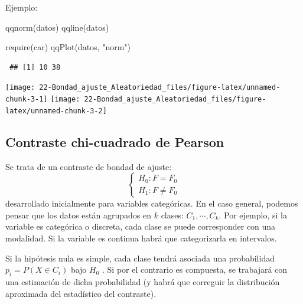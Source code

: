 \documentclass[
  10pt,
]{book}
\newenvironment{Shaded}{\begin{snugshade}}{\end{snugshade}}
\newcommand{\FunctionTok}[1]{\textcolor[rgb]{0.00,0.00,0.00}{#1}}
\newcommand{\NormalTok}[1]{#1}
\newcommand{\StringTok}[1]{\textcolor[rgb]{0.31,0.60,0.02}{#1}}
\theoremstyle{break}
\theoremstyle{nonumberplain}
\begin{document}
Ejemplo:

\begin{Shaded}
\begin{Highlighting}[]
\FunctionTok{qqnorm}\NormalTok{(datos)}
\FunctionTok{qqline}\NormalTok{(datos)}

\FunctionTok{require}\NormalTok{(car)}
\FunctionTok{qqPlot}\NormalTok{(datos, }\StringTok{"norm"}\NormalTok{)}
\end{Highlighting}
\end{Shaded}

\begin{verbatim}
 ## [1] 10 38
\end{verbatim}

\begin{center}\texttt{[image: 22-Bondad\_ajuste\_Aleatoriedad\_files/figure-latex/unnamed-chunk-3-1]} \texttt{[image: 22-Bondad\_ajuste\_Aleatoriedad\_files/figure-latex/unnamed-chunk-3-2]} \end{center}

\hypertarget{chi2test}{%
\subsection{Contraste chi-cuadrado de Pearson}\label{chi2test}}

Se trata de un contraste de bondad de ajuste:
\[\left \{
\begin{array}{l}
H_0:F=F_0\\
H_1:F\neq F_0\end{array}
\right.\]
desarrollado inicialmente para variables categóricas. En el caso general, podemos pensar que los datos están agrupados en \(k\) clases: \(C_1,\cdots,C_{k}\). Por ejemplo, si la variable es categórica o discreta, cada clase se puede corresponder con una modalidad. Si la variable es continua habrá que categorizarla en intervalos.

Si la hipótesis nula es simple, cada clase tendrá asociada una probabilidad \(p_{i}=P\left( X\in C_{i} \right)\) bajo \(H_0\) . Si por el contrario es compuesta, se trabajará con una estimación de dicha probabilidad (y habrá que correguir la distribución aproximada del estadístico del contraste).
\end{document}
